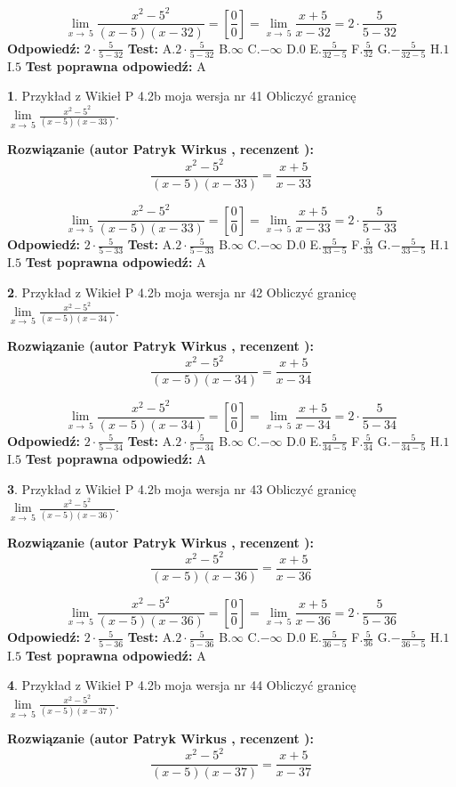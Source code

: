 \documentclass[12pt, a4paper]{article}
\theoremstyle{definition} %
\newtheorem{zad}{}
\newcommand{\zadStart}[1]{\begin{zad}#1\newline}
\newcommand{\zadStop}{\end{zad}}
\newcommand{\rozwStart}[2]{\noindent \textbf{Rozwiązanie (autor #1 , recenzent #2): }\newline}
\newcommand{\rozwStop}{\newline}
\newcommand{\odpStart}{\noindent \textbf{Odpowiedź:}\newline}
\newcommand{\odpStop}{\newline}
\newcommand{\testStart}{\noindent \textbf{Test:}\newline}
\newcommand{\testStop}{\newline}
\newcommand{\kluczStart}{\noindent \textbf{Test poprawna odpowiedź:}\newline}
\newcommand{\kluczStop}{\newline}
\begin{document}
$$\lim\limits_{x\to\ 5}\frac{x^{2}-5^{2}}{(x-5)(x-32)}=[\frac{0}{0}]=\lim\limits_{x\to\ 5}\frac{x+5}{x-32}=2 \cdot \frac{5}{5-32}$$
\rozwStop
\odpStart
$2 \cdot \frac{5}{5-32}$
\odpStop
\testStart
A.$2 \cdot \frac{5}{5-32}$
B.$\infty$
C.$-\infty$
D.$0$
E.$\frac{5}{32-5}$
F.$\frac{5}{32}$
G.$-\frac{5}{32-5}$
H.$1$
I.$5$
\testStop
\kluczStart
A
\kluczStop



\zadStart{Przykład z Wikieł P 4.2b moja wersja nr 41}
Obliczyć granicę $\lim\limits_{x\to\ 5}\frac{x^{2}-5^{2}}{(x-5)(x-33)}$.
\zadStop
\rozwStart{Patryk Wirkus}{}
$$\frac{x^{2}-5^{2}}{(x-5)(x-33)}=\frac{x+5}{x-33}$$

$$\lim\limits_{x\to\ 5}\frac{x^{2}-5^{2}}{(x-5)(x-33)}=[\frac{0}{0}]=\lim\limits_{x\to\ 5}\frac{x+5}{x-33}=2 \cdot \frac{5}{5-33}$$
\rozwStop
\odpStart
$2 \cdot \frac{5}{5-33}$
\odpStop
\testStart
A.$2 \cdot \frac{5}{5-33}$
B.$\infty$
C.$-\infty$
D.$0$
E.$\frac{5}{33-5}$
F.$\frac{5}{33}$
G.$-\frac{5}{33-5}$
H.$1$
I.$5$
\testStop
\kluczStart
A
\kluczStop



\zadStart{Przykład z Wikieł P 4.2b moja wersja nr 42}
Obliczyć granicę $\lim\limits_{x\to\ 5}\frac{x^{2}-5^{2}}{(x-5)(x-34)}$.
\zadStop
\rozwStart{Patryk Wirkus}{}
$$\frac{x^{2}-5^{2}}{(x-5)(x-34)}=\frac{x+5}{x-34}$$

$$\lim\limits_{x\to\ 5}\frac{x^{2}-5^{2}}{(x-5)(x-34)}=[\frac{0}{0}]=\lim\limits_{x\to\ 5}\frac{x+5}{x-34}=2 \cdot \frac{5}{5-34}$$
\rozwStop
\odpStart
$2 \cdot \frac{5}{5-34}$
\odpStop
\testStart
A.$2 \cdot \frac{5}{5-34}$
B.$\infty$
C.$-\infty$
D.$0$
E.$\frac{5}{34-5}$
F.$\frac{5}{34}$
G.$-\frac{5}{34-5}$
H.$1$
I.$5$
\testStop
\kluczStart
A
\kluczStop



\zadStart{Przykład z Wikieł P 4.2b moja wersja nr 43}
Obliczyć granicę $\lim\limits_{x\to\ 5}\frac{x^{2}-5^{2}}{(x-5)(x-36)}$.
\zadStop
\rozwStart{Patryk Wirkus}{}
$$\frac{x^{2}-5^{2}}{(x-5)(x-36)}=\frac{x+5}{x-36}$$

$$\lim\limits_{x\to\ 5}\frac{x^{2}-5^{2}}{(x-5)(x-36)}=[\frac{0}{0}]=\lim\limits_{x\to\ 5}\frac{x+5}{x-36}=2 \cdot \frac{5}{5-36}$$
\rozwStop
\odpStart
$2 \cdot \frac{5}{5-36}$
\odpStop
\testStart
A.$2 \cdot \frac{5}{5-36}$
B.$\infty$
C.$-\infty$
D.$0$
E.$\frac{5}{36-5}$
F.$\frac{5}{36}$
G.$-\frac{5}{36-5}$
H.$1$
I.$5$
\testStop
\kluczStart
A
\kluczStop



\zadStart{Przykład z Wikieł P 4.2b moja wersja nr 44}
Obliczyć granicę $\lim\limits_{x\to\ 5}\frac{x^{2}-5^{2}}{(x-5)(x-37)}$.
\zadStop
\rozwStart{Patryk Wirkus}{}
$$\frac{x^{2}-5^{2}}{(x-5)(x-37)}=\frac{x+5}{x-37}$$
\end{document}
